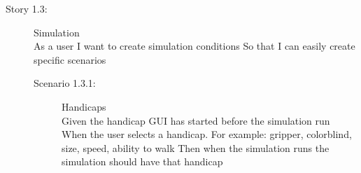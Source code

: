 \begin{description}
\item[Story 1.3:] Simulation\\
As a user
I want to create simulation conditions
So that I can easily create specific scenarios

\begin{description}
\item[Scenario 1.3.1:] Handicaps\\
Given the handicap GUI has started before the simulation run
When the user selects a handicap. For example: gripper, colorblind, size, speed, ability to walk
Then when the simulation runs the simulation should have that handicap
\end{description}
\end{description}